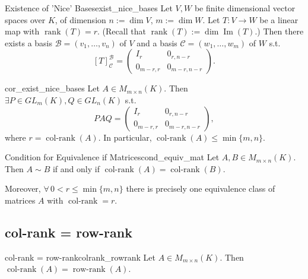 \begin{proposition}{Existence of 'Nice' Bases}{exist_nice_bases}
	Let $V, W$ be finite dimensional vector spaces over $K$, of dimension $n := \dim V$, $m := \dim W$. Let $T:V \to W$ be a linear map with $\operatorname{rank}(T) = r$. (Recall that $\operatorname{rank}(T) := \dim \operatorname{Im}(T)$.) Then there exists a basis $\mathcal{B} = (v_1, \hdots , v_n)$ of $V$ and a basis $\mathcal{C} = (w_1, \hdots , w_m)$ of $W$ s.t.
	\[
	[T]^{\mathcal{B}}_{\mathcal{C}} = \begin{pmatrix}
		I_r & 0_{r, n-r}\\
		0_{m-r, r} & 0_{m-r, n-r}
	\end{pmatrix}.
	\]
\end{proposition}

\begin{corollary}{}{cor_exist_nice_bases}
	Let $A \in M_{m \times n}(K)$. Then $\exists P \in GL_m(K), Q \in GL_n(K)$ s.t.
	\[
	PAQ = \begin{pmatrix}
		I_r & 0_{r, n-r}\\
		0_{m-r, r} & 0_{m-r, n-r}			
	\end{pmatrix},
	\]
	where $r = \operatorname{col-rank}(A)$. In particular, $\operatorname{col-rank}(A) \leq \min\{m,n\}$.
\end{corollary}

\begin{corollary}{Condition for Equivalence if Matrices}{cond_equiv_mat}
	Let $A, B \in M_{m \times n}(K)$. Then $A \sim B$ if and only if $\operatorname{col-rank}(A) = \operatorname{col-rank}(B)$. 
	
	Moreover, $\forall\, 0 < r \leq \min\{m, n\}$ there is precisely one equivalence class of matrices $A$ with $\operatorname{col-rank} = r$.
\end{corollary}

\subsection{col-rank = row-rank}

\begin{theorem}{col-rank = row-rank}{colrank_rowrank}
	Let $A \in M_{m \times n}(K)$. Then $\operatorname{col-rank}(A) = \operatorname{row-rank}(A)$.
\end{theorem}

